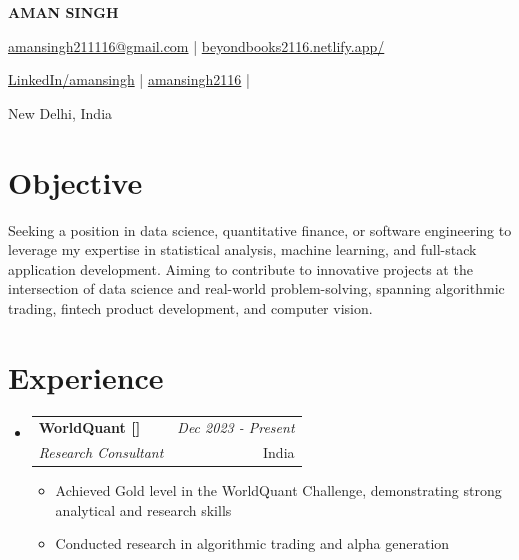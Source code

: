 \documentclass[a4paper,11pt]{article}
\makeatletter
\newcommand{\resumeSubheading}[4]{
\vspace{0.5mm}\item
    \begin{tabular*}{0.98\textwidth}[t]{l@{\extracolsep{\fill}}r}
        \textbf{#1} & \textit{\footnotesize{#4}} \\
        \textit{\footnotesize{#3}} &  \footnotesize{#2}\\
    \end{tabular*}
    \vspace{-2.4mm}
}
\newcommand{\resumeSubHeadingListStart}{\begin{itemize}[leftmargin=*,labelsep=1mm]}
\newcommand{\resumeItemListStart}{\begin{itemize}[leftmargin=*,labelsep=1mm,itemsep=0.5mm]}
\newcommand{\resumeSubHeadingListEnd}{\end{itemize}\vspace{2mm}}
\newcommand{\resumeItemListEnd}{\end{itemize}\vspace{-2mm}}
\newcommand{\socialicon}[1]{\raisebox{-0.05em}{\resizebox{!}{1em}{#1}}}
\newcommand{\headerfontiii}{\fontfamily{ppl}\selectfont} %
\makeatother
\begin{document}
\headerfontiii

\begin{center}
    {\Huge\textbf{AMAN SINGH}}
\end{center}
\vspace{-6mm}

\begin{center}
    \small{
    \href{mailto:amansingh211116@gmail.com}{amansingh211116@gmail.com} | 
    \href{https://beyondbooks2116.netlify.app/}{beyondbooks2116.netlify.app/}
    }
\end{center}
\vspace{-6mm}

\begin{center}
    \small{
    \socialicon{\faLinkedin} \href{https://www.linkedin.com/in/aman-singh-7a5976296/}{LinkedIn/amansingh} | 
    \socialicon{\faGithub} \href{https://github.com/amansingh2116}{amansingh2116} | 
    }
\end{center}
\vspace{-6mm}
\begin{center}
    \small{New Delhi, India}
\end{center}

\vspace{-4mm}

\section{\textbf{Objective}}
\vspace{1mm}
\small{
Seeking a position in data science, quantitative finance, or software engineering to leverage my expertise in statistical analysis, machine learning, and full-stack application development. Aiming to contribute to innovative projects at the intersection of data science and real-world problem-solving, spanning algorithmic trading, fintech product development, and computer vision.
}
\vspace{-2mm}

\section{\textbf{Experience}}
\vspace{-0.4mm}
  \resumeSubHeadingListStart
  \resumeSubheading
      {{WorldQuant [\href{https://www.worldquant.com}{\faIcon{globe}}]}}{India}
      {Research Consultant}{Dec 2023 - Present}
      \resumeItemListStart
        \item Achieved Gold level in the WorldQuant Challenge, demonstrating strong analytical and research skills
        \item Conducted research in algorithmic trading and alpha generation
      \resumeItemListEnd 
  \resumeSubHeadingListEnd
\vspace{-6mm}
\end{document}
